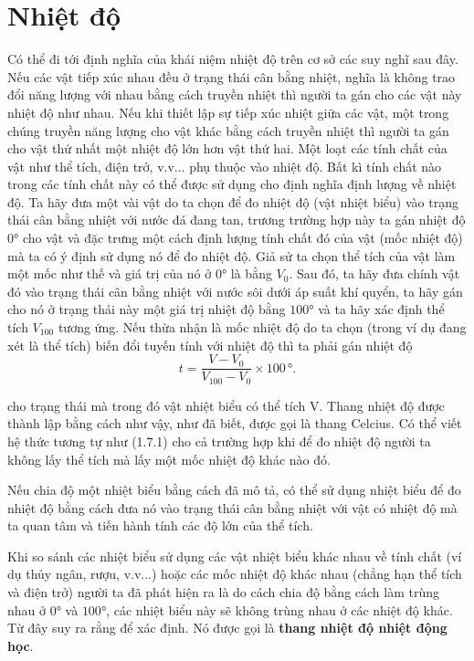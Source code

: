 \section{Nhiệt độ}\label{sec:10_7}

Có thể đi tới định nghĩa của khái niệm nhiệt độ trên cơ sở các suy nghĩ sau đây. Nếu các vật tiếp xúc nhau đều ở trạng thái cân bằng nhiệt, nghĩa là không trao đổi năng lượng với nhau bằng cách truyền nhiệt thì người ta gán cho các vật này nhiệt độ như nhau. Nếu khi thiết lập sự tiếp xúc nhiệt giữa các vật, một trong chúng truyền năng lượng cho vật khác bằng cách truyền nhiệt thì người ta gán cho vật thứ nhất một nhiệt độ lớn hơn vật thứ hai. Một loạt các tính chất của vật như thể tích, điện trở, v.v... phụ thuộc vào nhiệt độ. Bất kì tính chất nào trong các tính chất này có thể được sử dụng cho định nghĩa định lượng về nhiệt độ.
Ta hãy đưa một vài vật do ta chọn để đo nhiệt độ (vật nhiệt biểu) vào trạng thái cân bằng nhiệt với nước đá đang tan, trương trường hợp này ta gán nhiệt độ $0°$ cho vật và đặc trưng một cách định lượng tính chất đó của vật (mốc nhiệt độ) mà ta có ý định sử dụng nó để đo nhiệt độ. Giả sử ta chọn thể tích của vật làm một mốc như thế và giá trị của nó ở $0°$ là bằng $V_0$. Sau đó, ta hãy đưa chính vật đó vào trạng thái cân bằng nhiệt với nước sôi dưới áp suất khí quyển, ta hãy gán cho nó ở trạng thái này một giá trị nhiệt độ bằng $100°$ và ta hãy xác định thể tích $V_{100}$ tương ứng. Nếu thừa nhận là mốc nhiệt độ do ta chọn (trong ví dụ đang xét là thể tích) biến đổi tuyến tính với nhiệt độ thì ta phải gán nhiệt độ
\begin{equation}\label{eq:10_14}
	t = \frac{V - V_0}{V_{100} - V_0}\times 100\,\text{°}.
\end{equation}

\noindent
cho trạng thái mà trong đó vật nhiệt biểu có thể tích V. Thang nhiệt độ được thành lập bằng cách như vậy, như đã biết, được gọi là thang Celcius. Có thể viết hệ thức tương tự như (1.7.1) cho cả trường hợp khi để đo nhiệt độ người ta không lấy thể tích mà lấy một mốc nhiệt độ khác nào đó.

Nếu chia độ một nhiệt biểu bằng cách đã mô tả, có thể sử dụng nhiệt biểu để đo nhiệt độ bằng cách đưa nó vào trạng thái cân bằng nhiệt với vật có nhiệt độ mà ta quan tâm và tiến hành tính các độ lớn của thể tích.

Khi so sánh các nhiệt biểu sử dụng các vật nhiệt biểu khác nhau về tính chất (ví dụ thủy ngân, rượu, v.v...) hoặc các mốc nhiệt độ khác nhau (chẳng hạn thể tích và điện trở) người ta đã phát hiện ra là do cách chia độ bằng cách làm trùng nhau ở $0°$ và $100°$, các nhiệt biểu này sẽ không trùng nhau ở các nhiệt độ khác. Từ đây suy ra rằng để xác định. Nó được gọi là \textbf{thang nhiệt độ nhiệt động học}.

